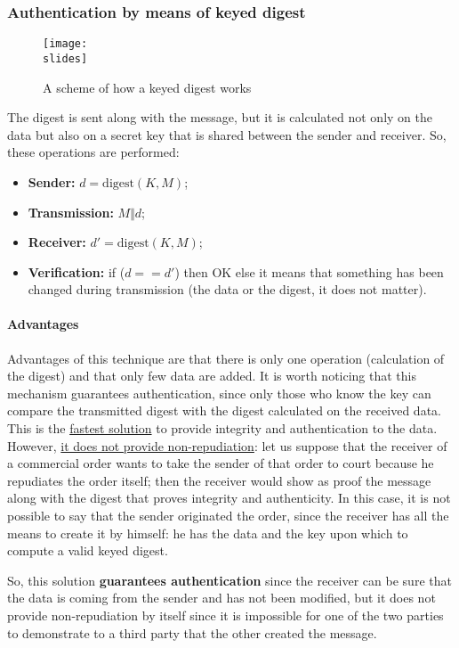 \subsubsection{Authentication by means of keyed digest}\label{chap:keyed_digest}
\begin{figure}[h]
    \centering
    \texttt{[image: \\slides]}
    \caption{A scheme of how a keyed digest works}
\end{figure}
The digest is sent along with the message, but it is calculated not only on the data but also on a secret key that is shared between the sender and receiver. So, these operations are performed:
\begin{itemize}
    \item \textbf{Sender:} \(d = \text{digest}(K, M)\);
    \item \textbf{Transmission:} \(M \Vert d\);
    \item \textbf{Receiver:} \(d' = \text{digest}(K, M)\);
    \item \textbf{Verification:} if (\(d == d'\)) then OK else it means that something has been changed during transmission (the data or the digest, it does not matter).
\end{itemize}

\paragraph*{Advantages}
Advantages of this technique are that there is only one operation (calculation of the digest) and that only few data are added. It is worth noticing that this mechanism guarantees authentication, since only those who know the key can compare the transmitted digest with the digest calculated on the received data. This is the \underline{fastest solution} to provide integrity and authentication to the data. However, \underline{it does not provide non-repudiation}: let us suppose that the receiver of a commercial order wants to take the sender of that order to court because he repudiates the order itself; then the receiver would show as proof the message along with the digest that proves integrity and authenticity. In this case, it is not possible to say that the sender originated the order, since the receiver has all the means to create it by himself: he has the data and the key upon which to compute a valid keyed digest.

So, this solution \textbf{guarantees authentication} since the receiver can be sure that the data is coming from the sender and has not been modified, but it does not provide non-repudiation by itself since it is impossible for one of the two parties to demonstrate to a third party that the other created the message.



